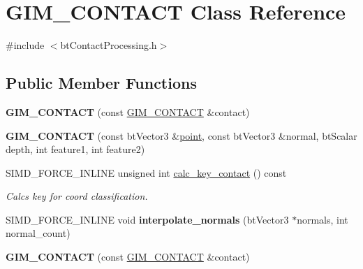 \hypertarget{class_g_i_m___c_o_n_t_a_c_t}{\section{G\+I\+M\+\_\+\+C\+O\+N\+T\+A\+C\+T Class Reference}
\label{class_g_i_m___c_o_n_t_a_c_t}
}


{\ttfamily \#include $<$bt\+Contact\+Processing.\+h$>$}

\subsection*{Public Member Functions}
\begin{DoxyCompactItemize}
\item 
\hypertarget{class_g_i_m___c_o_n_t_a_c_t_af2504893707107a602ccdcbf9af4c1ef}{{\bfseries G\+I\+M\+\_\+\+C\+O\+N\+T\+A\+C\+T} (const \hyperlink{class_g_i_m___c_o_n_t_a_c_t}{G\+I\+M\+\_\+\+C\+O\+N\+T\+A\+C\+T} \&contact)}\label{class_g_i_m___c_o_n_t_a_c_t_af2504893707107a602ccdcbf9af4c1ef}

\item 
\hypertarget{class_g_i_m___c_o_n_t_a_c_t_a9ae6abf57110c866605dc775aedd022e}{{\bfseries G\+I\+M\+\_\+\+C\+O\+N\+T\+A\+C\+T} (const bt\+Vector3 \&\hyperlink{structpoint}{point}, const bt\+Vector3 \&normal, bt\+Scalar depth, int feature1, int feature2)}\label{class_g_i_m___c_o_n_t_a_c_t_a9ae6abf57110c866605dc775aedd022e}

\item 
\hypertarget{class_g_i_m___c_o_n_t_a_c_t_a61fafe1bf77bfc847c7fedee96ce215f}{S\+I\+M\+D\+\_\+\+F\+O\+R\+C\+E\+\_\+\+I\+N\+L\+I\+N\+E unsigned int \hyperlink{class_g_i_m___c_o_n_t_a_c_t_a61fafe1bf77bfc847c7fedee96ce215f}{calc\+\_\+key\+\_\+contact} () const }\label{class_g_i_m___c_o_n_t_a_c_t_a61fafe1bf77bfc847c7fedee96ce215f}

\begin{DoxyCompactList}\small\item\em Calcs key for coord classification. \end{DoxyCompactList}\item 
\hypertarget{class_g_i_m___c_o_n_t_a_c_t_a2e204397a9e74dc10df19faafc71e074}{S\+I\+M\+D\+\_\+\+F\+O\+R\+C\+E\+\_\+\+I\+N\+L\+I\+N\+E void {\bfseries interpolate\+\_\+normals} (bt\+Vector3 $\ast$normals, int normal\+\_\+count)}\label{class_g_i_m___c_o_n_t_a_c_t_a2e204397a9e74dc10df19faafc71e074}

\item 
\hypertarget{class_g_i_m___c_o_n_t_a_c_t_af2504893707107a602ccdcbf9af4c1ef}{{\bfseries G\+I\+M\+\_\+\+C\+O\+N\+T\+A\+C\+T} (const \hyperlink{class_g_i_m___c_o_n_t_a_c_t}{G\+I\+M\+\_\+\+C\+O\+N\+T\+A\+C\+T} \&contact)}\label{class_g_i_m___c_o_n_t_a_c_t_af2504893707107a602ccdcbf9af4c1ef}


\end{DoxyCompactItemize}
